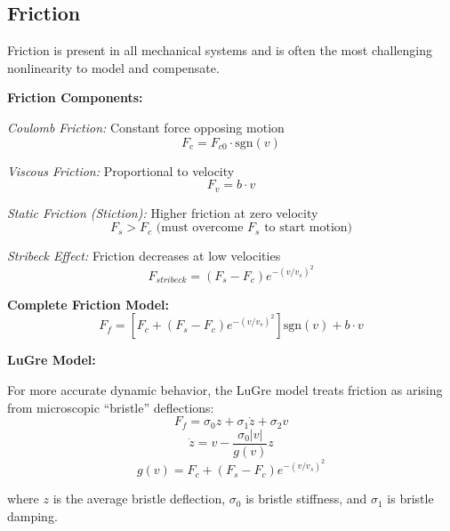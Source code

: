 \subsection{Friction}

Friction is present in all mechanical systems and is often the most challenging nonlinearity to model and compensate.

\textbf{Friction Components:}

\textit{Coulomb Friction:} Constant force opposing motion
\begin{equation}
    F_c = F_{c0} \cdot \text{sgn}(v)
\end{equation}

\textit{Viscous Friction:} Proportional to velocity
\begin{equation}
    F_v = b \cdot v
\end{equation}

\textit{Static Friction (Stiction):} Higher friction at zero velocity
\begin{equation}
    F_s > F_c \text{ (must overcome } F_s \text{ to start motion)}
\end{equation}

\textit{Stribeck Effect:} Friction decreases at low velocities
\begin{equation}
    F_{stribeck} = (F_s - F_c) e^{-(v/v_s)^2}
\end{equation}

\textbf{Complete Friction Model:}
\begin{equation}
    \boxed{F_f = \left[F_c + (F_s - F_c)e^{-(v/v_s)^2}\right] \text{sgn}(v) + b \cdot v}
    \label{eq:complete_friction}
\end{equation}

\textbf{LuGre Model:}

For more accurate dynamic behavior, the LuGre model treats friction as arising from microscopic ``bristle'' deflections:
\begin{equation}
    F_f = \sigma_0 z + \sigma_1 \dot{z} + \sigma_2 v
\end{equation}
\begin{equation}
    \dot{z} = v - \frac{\sigma_0 |v|}{g(v)} z
\end{equation}
\begin{equation}
    g(v) = F_c + (F_s - F_c)e^{-(v/v_s)^2}
\end{equation}

where $z$ is the average bristle deflection, $\sigma_0$ is bristle stiffness, and $\sigma_1$ is bristle damping.

